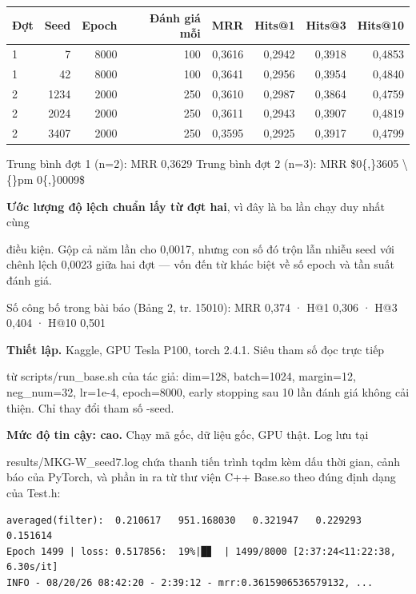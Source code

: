 \documentclass[11pt,a4paper]{article}
\newcommand{\code}[1]{{\ttfamily\small\color{codetext}#1}}
\begin{document}
\begin{center}\small
\begin{tabular}{@{}lrrrrrrr@{}}
\toprule
\textbf{Đợt} & \textbf{Seed} & \textbf{Epoch} & \textbf{Đánh giá mỗi} & \textbf{MRR} & \textbf{Hits@1} & \textbf{Hits@3} & \textbf{Hits@10}\\
\midrule
1 & 7 & 8000 & 100 & 0,3616 & 0,2942 & 0,3918 & 0,4853\\
1 & 42 & 8000 & 100 & 0,3641 & 0,2956 & 0,3954 & 0,4840\\
2 & 1234 & 2000 & 250 & 0,3610 & 0,2987 & 0,3864 & 0,4759\\
2 & 2024 & 2000 & 250 & 0,3611 & 0,2943 & 0,3907 & 0,4819\\
2 & 3407 & 2000 & 250 & 0,3595 & 0,2925 & 0,3917 & 0,4799\\
\bottomrule
\end{tabular}
\end{center}
Trung bình đợt 1 (n=2): MRR 0,3629 Trung bình đợt 2 (n=3): MRR \$0\{,\}3605 \textbackslash\{\}pm 0\{,\}0009\$

\textbf{Ước lượng độ lệch chuẩn lấy từ đợt hai}, vì đây là ba lần chạy duy nhất cùng

điều kiện. Gộp cả năm lần cho 0,0017, nhưng con số đó trộn lẫn nhiễu seed với chênh lệch 0,0023 giữa hai đợt --- vốn đến từ khác biệt về số epoch và tần suất đánh giá.

Số công bố trong bài báo (Bảng 2, tr. 15010): MRR 0,374 · H@1 0,306 · H@3 0,404 · H@10 0,501

\textbf{Thiết lập.} Kaggle, GPU Tesla P100, torch 2.4.1. Siêu tham số đọc trực tiếp

từ \code{scripts/run\_base.sh} của tác giả: \code{dim=128}, \code{batch=1024}, \code{margin=12}, \code{neg\_num=32}, \code{lr=1e-4}, \code{epoch=8000}, early stopping sau 10 lần đánh giá không cải thiện. Chỉ thay đổi tham số \code{-seed}.

\textbf{Mức độ tin cậy: cao.} Chạy mã gốc, dữ liệu gốc, GPU thật. Log lưu tại

\code{results/MKG-W\_seed7.log} chứa thanh tiến trình tqdm kèm dấu thời gian, cảnh báo của PyTorch, và phần in ra từ thư viện C++ \code{Base.so} theo đúng định dạng của \code{Test.h}:

\begin{lstlisting}
averaged(filter):  0.210617   951.168030   0.321947   0.229293   0.151614
Epoch 1499 | loss: 0.517856:  19%|█▊  | 1499/8000 [2:37:24<11:22:38, 6.30s/it]
INFO - 08/20/26 08:42:20 - 2:39:12 - mrr:0.3615906536579132, ...
\end{lstlisting}
\end{document}
